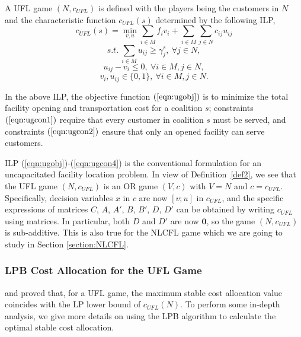 \documentclass[ijoc,nonblindrev]{informs3} %
\begin{document}
\begin{definition}\label{defi:ug}
A UFL game $(N,c_{UFL})$ is defined with the players being the customers in $N$ and the characteristic function  $c_{UFL}(s)$ determined by  the following ILP,
\begin{equation}\label{eqn:ugobj}
c_{UFL}(s) = \min_{v,u} \sum_{i \in M} f_iv_i + \sum_{i \in M} \sum_{j \in N} c_{ij}u_{ij}
\end{equation}
\begin{equation} \label{eqn:ugcon1}
s.t.~\sum_{i \in M} u_{ij} \geq \gamma_j^s, ~\forall j \in N,
\end{equation}
\begin{equation}\label{eqn:ugcon2}
u_{ij} - v_i \leq 0, ~\forall i \in M, j \in N,
\end{equation}
\begin{equation}\label{eqn:ugcon4}
v_i, u_{ij} \in \{0,1\}, ~\forall i \in M, j \in N.
\end{equation}
\end{definition}


In the above ILP, the objective function $(\ref{eqn:ugobj})$ is to minimize the  total facility opening and transportation cost for a coalition $s$; constraints $(\ref{eqn:ugcon1})$ require that every customer in coalition $s$ must be served, and constraints $(\ref{eqn:ugcon2})$ ensure that only an opened facility can  serve customers. 


ILP (\ref{eqn:ugobj})-(\ref{eqn:ugcon4}) is the conventional formulation for an uncapacitated facility location problem. In view of Definition~\ref{def2}, we see that  the UFL game $ (N,c_{UFL})$ is an OR game $(V,c)$ with $V=N$ and $c = c_{UFL}$. Specifically, decision variables $x$ in $c$ are now $[v;u]$ in $c_{UFL}$, and the specific expressions of matrices $C$, $A$, $A'$, $B$, $B'$, $D$, $D'$ can be obtained by writing $c_{UFL}$ using matrices. In particular,
both $D$ and $D'$ are now $\textbf{0}$, so the game $ (N,c_{UFL})$ is sub-additive. This is also true for the NLCFL game which we are going to study in Section \ref{section:NLCFL}.


\subsubsection{LPB Cost Allocation for the UFL Game}\label{section:LPBUFL}
\cite{Kolen1983FacilityLocationGame} and \cite{Goemans2000FacilityLocationGames} proved that, for a UFL game, the maximum stable cost allocation value coincides with the LP lower bound of $c_{UFL}(N)$. To perform some in-depth analysis, we give more details on  using the LPB algorithm to calculate the optimal stable cost allocation. 
\end{document}
